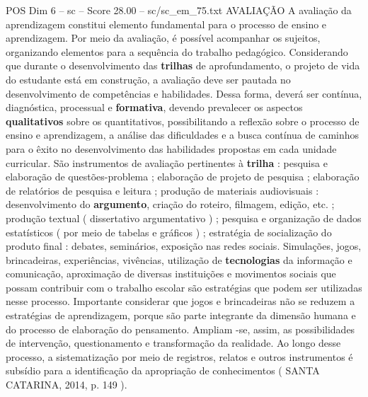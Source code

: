 \begin{textsample}{POS Dim 6 – sc – Score 28.00 – sc/sc\_em\_75.txt}
AVALIAÇÃO A avaliação da aprendizagem constitui elemento fundamental para o processo de ensino e aprendizagem.
Por meio da avaliação, é possível acompanhar os sujeitos, organizando elementos para a sequência do trabalho pedagógico.
Considerando que durante o desenvolvimento das \textbf{trilhas} de aprofundamento, o projeto de vida do estudante está em construção, a avaliação deve ser pautada no desenvolvimento de competências e habilidades.
Dessa forma, deverá ser contínua, diagnóstica, processual e \textbf{formativa}, devendo prevalecer os aspectos \textbf{qualitativos} sobre os quantitativos, possibilitando a reflexão sobre o processo de ensino e aprendizagem, a análise das dificuldades e a busca contínua de caminhos para o êxito no desenvolvimento das habilidades propostas em cada unidade curricular.
São instrumentos de avaliação pertinentes à \textbf{trilha} : pesquisa e elaboração de questões-problema ; elaboração de projeto de pesquisa ; elaboração de relatórios de pesquisa e leitura ; produção de materiais audiovisuais : desenvolvimento do \textbf{argumento}, criação do roteiro, filmagem, edição, etc. ; produção textual ( dissertativo argumentativo ) ; pesquisa e organização de dados estatísticos ( por meio de tabelas e gráficos ) ; estratégia de socialização do produto final : debates, seminários, exposição nas redes sociais.
Simulações, jogos, brincadeiras, experiências, vivências, utilização de \textbf{tecnologias} da informação e comunicação, aproximação de diversas instituições e movimentos sociais que possam contribuir com o trabalho escolar são estratégias que podem ser utilizadas nesse processo.
Importante considerar que jogos e brincadeiras não se reduzem a estratégias de aprendizagem, porque são parte integrante da dimensão humana e do processo de elaboração do pensamento.
Ampliam -se, assim, as possibilidades de intervenção, questionamento e transformação da realidade.
Ao longo desse processo, a sistematização por meio de registros, relatos e outros instrumentos é subsídio para a identificação da apropriação de conhecimentos ( SANTA CATARINA, 2014, p. 149 ).

\end{textsample}
